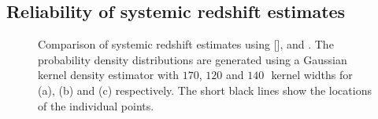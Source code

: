 \subsection{Reliability of systemic redshift estimates}
\label{sec:ch4_redshifts}

\begin{figure}
   \captionsetup[subfigure]{labelformat=empty}
    \centering
    \subfloat[\label{fig:redshift_comparison_a}]{}
    \subfloat[\label{fig:redshift_comparison_b}]{}
    \subfloat[\label{fig:redshift_comparison_c}]{}
    \caption[{Comparison of systemic redshift estimates using [], \hb and \hans.}]{Comparison of systemic redshift estimates using [], \hb and \hans. The probability density distributions are generated using a Gaussian kernel density estimator with $170$, $120$ and $140$\,\kms\, kernel widths for (a), (b) and (c) respectively. The short black lines show the locations of the individual points.}
    \label{fig:redshift_comparison}
\end{figure}


